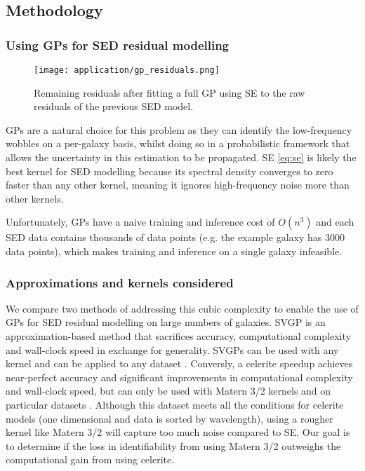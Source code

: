 \subsection{Methodology}
\subsubsection{Using GPs for SED residual modelling}
\begin{figure}[H]
    \texttt{[image: application/gp\_residuals.png]}
    \caption{Remaining residuals after fitting a full GP using SE \cite{galaxy-gp-noise} to the raw residuals of the previous SED model.}
\end{figure}
GPs are a natural choice for this problem as they can identify the low-frequency wobbles on a per-galaxy basis, whilst doing so in a probabilistic framework that allows the uncertainty in this estimation to be propagated. SE \ref{eq:se} is likely the best kernel for SED modelling because its spectral density converges to zero faster than any other kernel, meaning it ignores high-frequency noise more than other kernels. 

Unfortunately, GPs have a naive training and inference cost of $O(n^3)$ and each SED data contains thousands of data points (e.g. the example galaxy has 3000 data points), which makes training and inference on a single galaxy infeasible. 

\subsubsection{Approximations and kernels considered}
We compare two methods of addressing this cubic complexity to enable the use of GPs for SED residual modelling on large numbers of galaxies. SVGP is an approximation-based method that sacrifices accuracy, computational complexity and wall-clock speed in exchange for generality. SVGPs can be used with any kernel and can be applied to any dataset \cite{svgp}. Conversly, a celerite speedup achieves near-perfect accuracy and significant improvements in computational complexity and wall-clock speed, but can only be used with Matern 3/2 kernels and on particular datasets \cite{foreman-mackay}. Although this dataset meets all the conditions for celerite models (one dimensional and data is sorted by wavelength), using a rougher kernel like Matern 3/2 will capture too much noise compared to SE. Our goal is to determine if the loss in identifiability from using Matern 3/2 outweighs the computational gain from using celerite.

